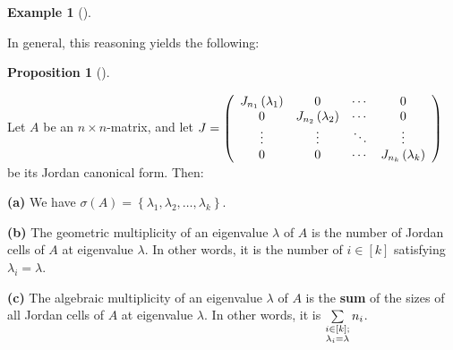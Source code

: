 \documentclass[numbers=enddot,12pt,final,onecolumn,notitlepage]{scrartcl}%
\numberwithin{exer}{subsection}
\theoremstyle{definition}
\newtheorem{prop}[theo]{Proposition}
\newenvironment{proposition}[1][]
{\begin{prop}[#1]\begin{leftbar}}
{\end{leftbar}\end{prop}}
\newtheorem{exam}[theo]{Example}
\newenvironment{example}[1][]
{\begin{exam}[#1]\begin{leftbar}}
{\end{leftbar}\end{exam}}
\let\sumnonlimits\sum
\renewcommand{\sum}{\sumnonlimits\limits}
\begin{document}
\begin{example}
\end{example}

In general, this reasoning yields the following:

\begin{proposition}
Let $A$ be an $n\times n$-matrix, and let $J=\left(
\begin{array}
[c]{cccc}%
J_{n_{1}}\left(  \lambda_{1}\right)   & 0 & \cdots & 0\\
0 & J_{n_{2}}\left(  \lambda_{2}\right)   & \cdots & 0\\
\vdots & \vdots & \ddots & \vdots\\
0 & 0 & \cdots & J_{n_{k}}\left(  \lambda_{k}\right)
\end{array}
\right)  $ be its Jordan canonical form. Then:

\textbf{(a)} We have $\sigma\left(  A\right)  =\left\{  \lambda_{1}%
,\lambda_{2},\ldots,\lambda_{k}\right\}  $.

\textbf{(b)} The geometric multiplicity of an eigenvalue $\lambda$ of $A$ is
the number of Jordan cells of $A$ at eigenvalue $\lambda$. In other words, it
is the number of $i\in\left[  k\right]  $ satisfying $\lambda_{i}=\lambda$.

\textbf{(c)} The algebraic multiplicity of an eigenvalue $\lambda$ of $A$ is
the \textbf{sum} of the sizes of all Jordan cells of $A$ at eigenvalue
$\lambda$. In other words, it is $\sum\limits_{\substack{i\in\left[  k\right]
;\\\lambda_{i}=\lambda}}n_{i}$.
\end{proposition}
\end{document}
